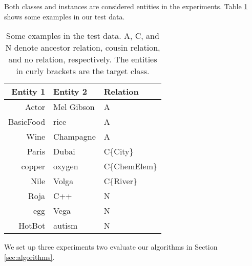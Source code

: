 Both classes and instances are considered entities in the experiments.
Table \ref{table:examples} shows some examples in our test data.

\begin{table}[ht]
  \centering
  {\small
  \begin{tabular}{|r|l|l|}
    \hline
    {\bf Entity 1} & {\bf Entity 2} & {\bf Relation}                     \\
    \hline
    \hline
    Actor & Mel Gibson & A \\
    BasicFood & rice & A \\
    Wine & Champagne & A \\
    \hline
    Paris & Dubai & C\{City\} \\
    copper & oxygen & C\{ChemElem\} \\
    Nile & Volga & C\{River\} \\
    \hline
    Roja & C++ & N \\
    egg & Vega & N \\
    HotBot & autism & N \\
    \hline
  \end{tabular}
  \caption{Some examples in the test data. A, C, and N denote ancestor relation, cousin relation, and no relation, respectively. The entities in curly brackets are the target class.}
  }
  \label{table:examples}
\end{table}

We set up three experiments two evaluate our algorithms in Section \ref{sec:algorithms}.

